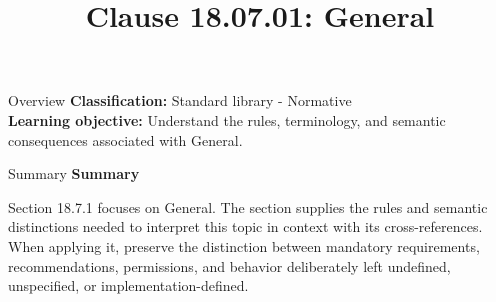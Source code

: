 \documentclass[10pt,letterpaper]{article}
\title{Clause 18.07.01: General}
\author{}
\date{}
\begin{document}
\maketitle
\begin{CornellOverviewBox}{Overview}
\textbf{Classification:} Standard library - Normative\\[2pt]
\textbf{Learning objective:} Understand the rules, terminology, and semantic consequences associated with General.
\end{CornellOverviewBox}\begin{CornellSummaryBox}{Summary}
{\sffamily\bfseries\color{Accent} Summary}\par\vspace{3pt}Section 18.7.1 focuses on General. The section supplies the rules and semantic distinctions needed to interpret this topic in context with its cross-references. When applying it, preserve the distinction between mandatory requirements, recommendations, permissions, and behavior deliberately left undefined, unspecified, or implementation-defined.
\end{CornellSummaryBox}
\end{document}
